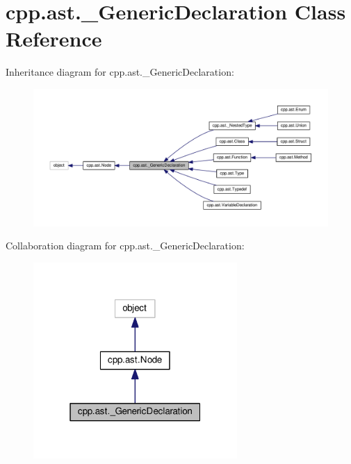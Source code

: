 \hypertarget{classcpp_1_1ast_1_1__GenericDeclaration}{}\section{cpp.\+ast.\+\_\+\+Generic\+Declaration Class Reference}
\label{classcpp_1_1ast_1_1__GenericDeclaration}


Inheritance diagram for cpp.\+ast.\+\_\+\+Generic\+Declaration\+:\nopagebreak
\begin{figure}[H]
\begin{center}
\leavevmode
\includegraphics[width=350pt]{classcpp_1_1ast_1_1__GenericDeclaration__inherit__graph}
\end{center}
\end{figure}


Collaboration diagram for cpp.\+ast.\+\_\+\+Generic\+Declaration\+:\nopagebreak
\begin{figure}[H]
\begin{center}
\leavevmode
\includegraphics[width=220pt]{classcpp_1_1ast_1_1__GenericDeclaration__coll__graph}
\end{center}
\end{figure}
